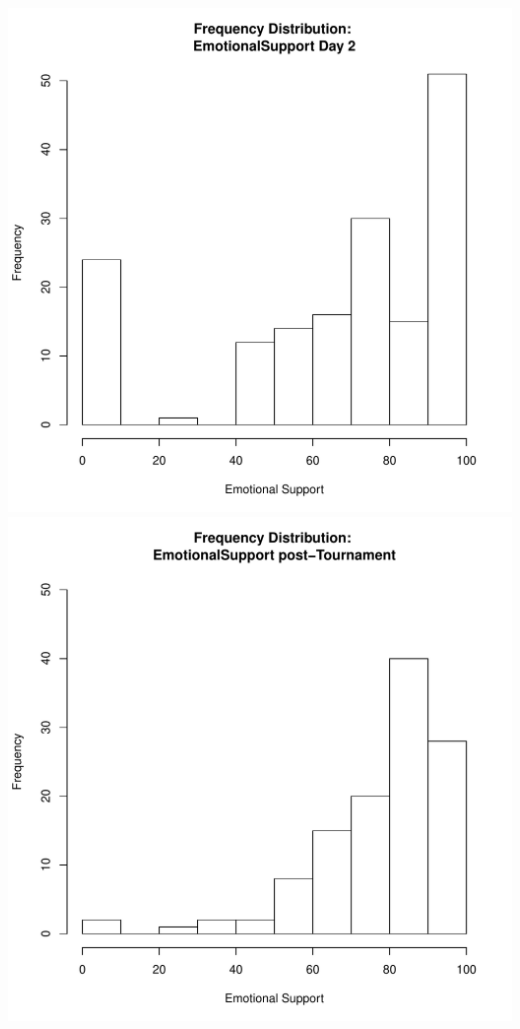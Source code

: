 \documentclass[12pt]{report}
\begin{document}
\includegraphics[scale =.4]{../images/distEmotionalSupportDay2.pdf}
\includegraphics[scale =.4]{../images/distEmotionalSupportPost.pdf}
\end{document}
